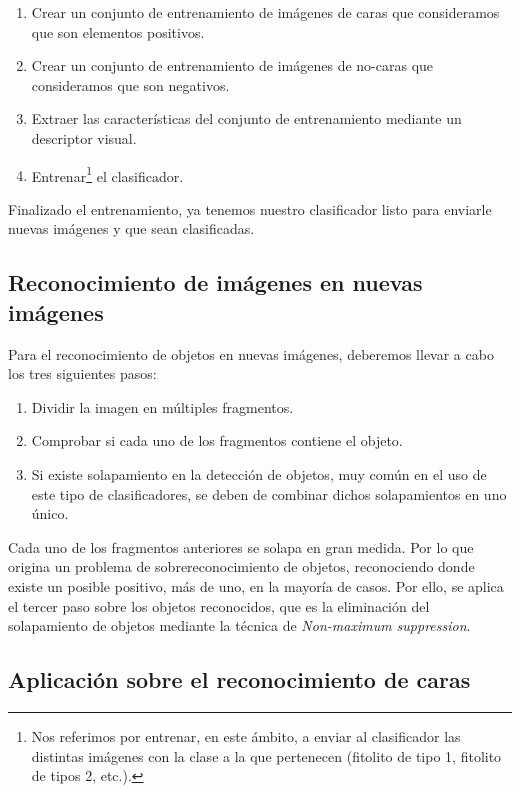 \begin{enumerate}[1.]
  \item Crear un conjunto de entrenamiento de imágenes de caras que consideramos que son elementos positivos.
  \item Crear un conjunto de entrenamiento de imágenes de no-caras que consideramos que son negativos.
  \item Extraer las características del conjunto de entrenamiento  mediante un descriptor visual.
  \item Entrenar\footnote{Nos referimos por entrenar, en este ámbito, a enviar al clasificador las distintas imágenes con la clase a la que pertenecen (fitolito de tipo 1, fitolito de tipos 2, etc.).} el clasificador.
\end{enumerate}

 Finalizado el entrenamiento, ya tenemos nuestro clasificador listo para enviarle nuevas imágenes y que sean clasificadas.
 
\subsection{Reconocimiento de imágenes en nuevas imágenes}
Para el reconocimiento de objetos en nuevas imágenes, deberemos llevar a cabo los tres siguientes pasos:

\begin{enumerate}[1.]
  \item Dividir la imagen en múltiples fragmentos.
  \item Comprobar si cada uno de los fragmentos contiene el objeto.
  \item Si existe solapamiento en la detección de objetos, muy común en el uso de este tipo de clasificadores, se deben de combinar dichos solapamientos en uno único.
\end{enumerate}

Cada uno de los fragmentos anteriores se solapa en gran medida. Por lo que origina un problema de sobrereconocimiento de objetos, reconociendo donde existe un posible positivo, más de uno, en la mayoría de casos. Por ello, se aplica el tercer paso sobre los objetos reconocidos, que es la eliminación del solapamiento de objetos mediante la técnica de \textit{Non-maximum suppression}.

\subsection{Aplicación sobre el reconocimiento de caras}

